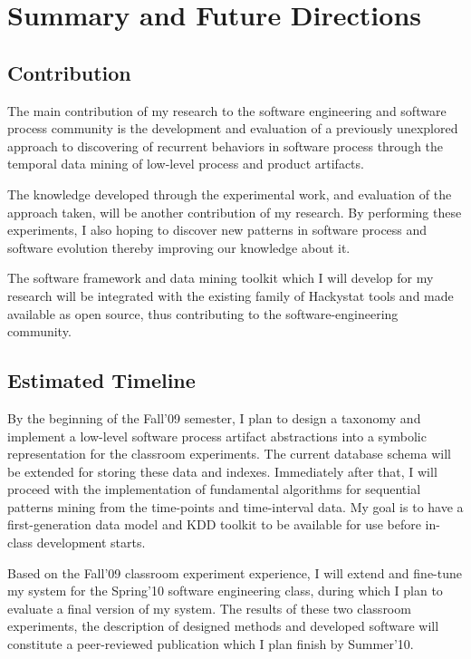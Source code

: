 \chapter{Summary and Future Directions} \label{contribution}

\section{Contribution}
The main contribution of my research to the software engineering and software process community is the development and evaluation of a previously unexplored approach to discovering of recurrent behaviors in software process through the temporal data mining of low-level process and product artifacts.

The knowledge developed through the experimental work, and evaluation of the approach taken, will be another contribution of my research. By performing these experiments, I also hoping to discover new patterns in software process and software evolution thereby improving our knowledge about it.

The software framework and data mining toolkit which I will develop for my research will be integrated with the existing family of Hackystat tools and made available as open source, thus contributing to the software-engineering community.

\section{Estimated Timeline}
By the beginning of the Fall'09 semester, I plan to design a taxonomy and implement a low-level software process artifact abstractions into a symbolic representation for the classroom experiments. The current database schema will be extended for storing these data and indexes. Immediately after that, I will proceed with the implementation of fundamental algorithms for sequential patterns mining from the time-points and time-interval data. My goal is to have a first-generation data model and KDD toolkit to be available for use before in-class development starts. 

Based on the Fall'09 classroom experiment experience, I will extend and fine-tune my system for the Spring'10 software engineering class, during which I plan to evaluate a final version of my system. The results of these two classroom experiments, the description of designed methods and developed software will constitute a peer-reviewed publication which I plan finish by Summer'10.

